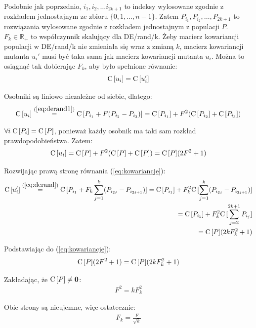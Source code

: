 \documentclass[a4paper,onecolumn,oneside,11pt,wide,floatssmall]{mwrep}
\def\C{{\rm C}\,}
\theoremstyle{definition}
\theoremstyle{plain}%
\theoremstyle{remark}
\begin{document}
Podobnie jak poprzednio, $i_1, i_2, \dots i_{2k+1}$ to indeksy wylosowane zgodnie z rozkładem jednostajnym ze zbioru 
$\{0, 1, \dots, n-1\}$. Zatem $P_{i_1}, P_{i_2}, \dots, P_{2k+1}$ to rozwiązania wylosowane zgodnie z rozkładem 
jednostajnym z populacji $P$. $F_k\in\mathbb{R_+}$ to współczynnik skalujący dla DE/rand/k. 
Żeby macierz kowariancji populacji w DE/rand/k nie zmieniała się wraz z zmianą $k$, 
macierz kowariancji mutanta $u_i'$ musi być taka sama jak macierz kowariancji mutanta $u_i$.
Można to osiągnąć tak dobierając $F_k$, aby było spełnione równanie:
\begin{equation} \label{eq:kowariancje}
\C[u_i] = \C[u_i']
\end{equation}

Osobniki są liniowo niezależne od siebie, dlatego:
\begin{align*}
\C[u_i] \overset{(\ref{eq:derand1})}{=} \C[P_{i_1} + F(P_{i_2} - P_{i_3})] = \C[P_{i_1}] + F^2(\C[P_{i_2}] + \C[P_{i_3}])
\end{align*}

$\forall{i}\hspace{1mm}\C[P_i] = \C[P]$, ponieważ każdy osobnik ma taki sam rozkład prawdopodobieństwa. Zatem:
\begin{equation} \label{eq:macierz_kow_mutanta}
\C[u_i] = \C[P] + F^2(\C[P] + \C[P]) = \C[P](2F^2 + 1)
\end{equation}

Rozwijając prawą stronę równania (\ref{eq:kowariancje}):
\begin{align*}
\C[u_i'] \overset{(\ref{eq:derand})}{=} \C[P_{i_1} + F_k\sum\limits_{j=1}^k (P_{i_{2j}} - P_{i_{2j+1}})] 
= \C[P_{i_1}] + F_k^2\C[\sum\limits_{j=1}^k (P_{i_{2j}} - P_{i_{2j+1}})] \\
= \C[P_{i_1}] + F_k^2\C[\sum\limits_{j=2}^{2k+1} P_{i_{j}}] \\
= \C[P](2kF_k^2 + 1)
\end{align*}

Podstawiając do (\ref{eq:kowariancje}):
\begin{align*}
\C[P](2F^2 + 1) = \C[P](2kF_k^2 + 1)
\end{align*}

Zakładając, że $\C[P] \neq \textbf{0}$:
\begin{align*}
F^2 = kF_k^2
\end{align*}

Obie strony są nieujemne, więc ostatecznie:
\begin{align*}
F_k = \frac{F}{\sqrt{k}}
\end{align*}
\end{document}
